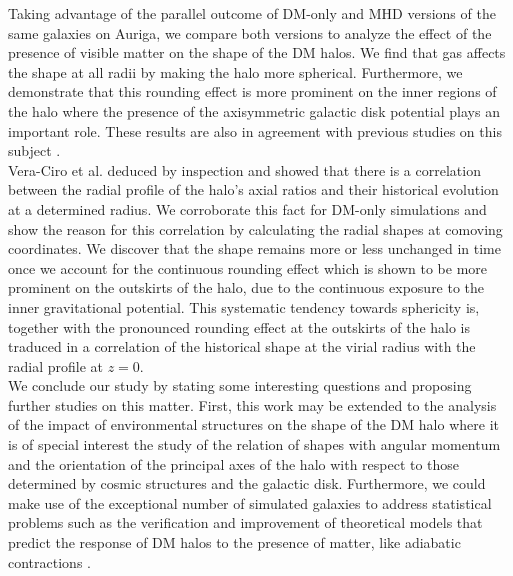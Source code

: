 Taking advantage of the parallel outcome of DM-only and MHD versions of the same galaxies on Auriga, we compare both versions to analyze the effect of the presence of visible matter on the shape of the DM halos. We find that gas affects the shape at all radii by making the halo more spherical. Furthermore, we demonstrate that this rounding effect is more prominent on the inner regions of the halo where the presence of the axisymmetric galactic disk potential plays an important role. These results are also in agreement with previous studies on this subject \cite{Barnes_and_Hernquist_1996,Springel_et_al._2004,Bryan_et_al._2013}.\\

Vera-Ciro et al. deduced by inspection and showed that there is a correlation between the radial profile of the halo's axial ratios and their historical evolution at a determined radius. We corroborate this fact for DM-only simulations and show the reason for this correlation by calculating the radial shapes at comoving coordinates. We discover that the shape remains more or less unchanged in time once we account for the continuous rounding effect which is shown to be more prominent on the outskirts of the halo, due to the continuous exposure to the inner gravitational potential. This systematic tendency towards sphericity is, together with the pronounced rounding effect at the outskirts of the halo is traduced in a correlation of the historical shape at the virial radius with the radial profile at $z=0$.\\

We conclude our study by stating some interesting questions and proposing further studies on this matter. First, this work may be extended to the analysis of the impact of environmental structures on the shape of the DM halo where it is of special interest the study of the relation of shapes with angular momentum and the orientation of the principal axes of the halo with respect to those determined by cosmic structures and the galactic disk. Furthermore, we could make use of the exceptional number of simulated galaxies to address statistical problems such as the verification and improvement of theoretical models that predict the response of DM halos to the presence of matter, like adiabatic contractions \cite{Gnedin_et_al._2004}. \\




 
 
